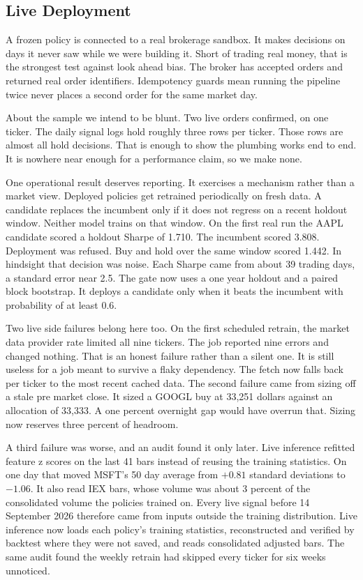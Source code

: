 \documentclass[conference]{IEEEtran}
\begin{document}
\subsection{Live Deployment}

A frozen policy is connected to a real brokerage sandbox. It makes decisions on days it never saw while we were building it. Short of trading real money, that is the strongest test against look ahead bias. The broker has accepted orders and returned real order identifiers. Idempotency guards mean running the pipeline twice never places a second order for the same market day.

About the sample we intend to be blunt. Two live orders confirmed, on one ticker. The daily signal logs hold roughly three rows per ticker. Those rows are almost all hold decisions. That is enough to show the plumbing works end to end. It is nowhere near enough for a performance claim, so we make none.

One operational result deserves reporting. It exercises a mechanism rather than a market view. Deployed policies get retrained periodically on fresh data. A candidate replaces the incumbent only if it does not regress on a recent holdout window. Neither model trains on that window. On the first real run the AAPL candidate scored a holdout Sharpe of 1.710. The incumbent scored 3.808. Deployment was refused. Buy and hold over the same window scored 1.442. In hindsight that decision was noise. Each Sharpe came from about 39 trading days, a standard error near 2.5. The gate now uses a one year holdout and a paired block bootstrap. It deploys a candidate only when it beats the incumbent with probability of at least 0.6.

Two live side failures belong here too. On the first scheduled retrain, the market data provider rate limited all nine tickers. The job reported nine errors and changed nothing. That is an honest failure rather than a silent one. It is still useless for a job meant to survive a flaky dependency. The fetch now falls back per ticker to the most recent cached data. The second failure came from sizing off a stale pre market close. It sized a GOOGL buy at 33,251 dollars against an allocation of 33,333. A one percent overnight gap would have overrun that. Sizing now reserves three percent of headroom.

A third failure was worse, and an audit found it only later. Live inference refitted feature z scores on the last 41 bars instead of reusing the training statistics. On one day that moved MSFT's 50 day average from $+0.81$ standard deviations to $-1.06$. It also read IEX bars, whose volume was about 3 percent of the consolidated volume the policies trained on. Every live signal before 14 September 2026 therefore came from inputs outside the training distribution. Live inference now loads each policy's training statistics, reconstructed and verified by backtest where they were not saved, and reads consolidated adjusted bars. The same audit found the weekly retrain had skipped every ticker for six weeks unnoticed.
\end{document}
